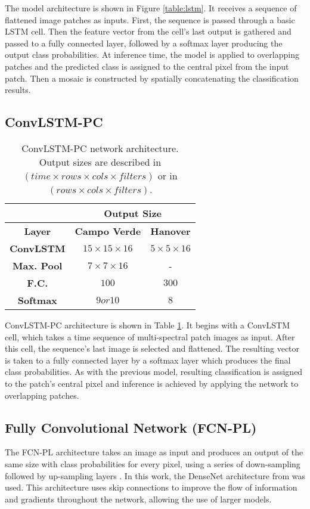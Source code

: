 The model architecture is shown in Figure \ref{table:lstm}. It receives a sequence of flattened image patches as inputs. First, the sequence is passed through a basic LSTM cell. Then the feature vector from the cell's last output is gathered and passed to a fully connected layer, followed by a softmax layer producing the output class probabilities. At inference time, the model is applied to overlapping patches and the predicted class is assigned to the central pixel from the input patch. Then a mosaic is constructed by spatially concatenating the classification results.


\subsection{ConvLSTM-PC}

\begin{table}[]
\centering
\caption{ConvLSTM-PC network architecture. Output sizes are described in $(time\times rows\times cols\times filters)$ or in $(rows\times cols\times filters)$. }
\label{table:convlstm}
\begin{tabular}{|c|c|c|}
\hline
\multicolumn{1}{|l|}{} & \multicolumn{2}{c|}{\textbf{Output Size}}     \\ \hline
\textbf{Layer}         & \textbf{Campo Verde}   & \textbf{Hanover}     \\ \hline
\textbf{ConvLSTM}      & $15\times 15\times 16$ & $5\times 5\times 16$ \\ \hline
\textbf{Max. Pool}     & $7\times 7\times 16$   & -                    \\ \hline
\textbf{F.C.}          & $100$                  & $300$                \\ \hline
\textbf{Softmax}       & $9 or 10$              & $8$                  \\ \hline
\end{tabular}
\end{table}

ConvLSTM-PC architecture is shown in Table \ref{table:convlstm}. It begins with a ConvLSTM cell, which takes a time sequence of multi-spectral patch images as input. After this cell, the sequence's last image is selected and flattened. The resulting vector is taken to a fully connected layer by a softmax layer which produces the final class probabilities. As with the previous model, resulting classification is assigned to the patch's central pixel and inference is achieved by applying the network to overlapping patches.

\subsection{Fully Convolutional Network (FCN-PL)}

The FCN-PL architecture takes an image as input and produces an output of the same size with class probabilities for every pixel, using a series of down-sampling followed by up-sampling layers \cite{long2015fully}. In this work, the DenseNet architecture from \cite{iandola2014densenet} was used. This architecture uses skip connections to improve the flow of information and gradients throughout the network, allowing the use of larger models.
